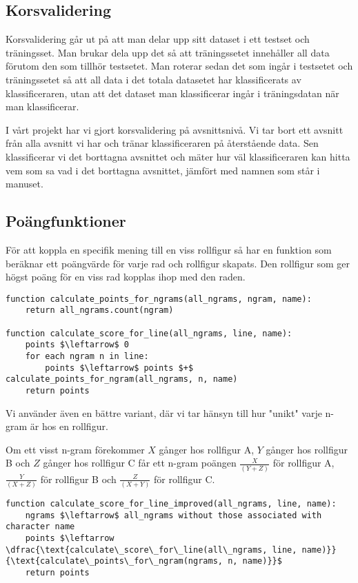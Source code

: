 \documentclass[a5paper]{article}
\begin{document}
\subsection{Korsvalidering}
Korsvalidering går ut på att man delar upp sitt dataset i ett testset och
träningsset. Man brukar dela upp det så att träningssetet innehåller all data
förutom den som tillhör testsetet. Man roterar sedan det som ingår i testsetet
och träningssetet så att all data i det totala datasetet har klassificerats av
klassificeraren, utan att det dataset man klassificerar ingår i träningsdatan
när man klassificerar.

I vårt projekt har vi gjort korsvalidering på avsnittsnivå. Vi tar bort ett
avsnitt från alla avsnitt vi har och tränar klassificeraren på återstående data.
Sen klassificerar vi det borttagna avsnittet och mäter hur väl klassificeraren
kan hitta vem som sa vad i det borttagna avsnittet, jämfört med namnen som står
i manuset.

\subsection{Poängfunktioner}
För att koppla en specifik mening till en viss rollfigur så har en funktion som
beräknar ett poängvärde för varje rad och rollfigur skapats. Den rollfigur som ger
högst poäng för en viss rad kopplas ihop med den raden.

\begin{lstlisting}[mathescape, columns=fullflexible, basicstyle=\fontfamily{lmvtt}\selectfont]
function calculate_points_for_ngrams(all_ngrams, ngram, name):
    return all_ngrams.count(ngram)

function calculate_score_for_line(all_ngrams, line, name):
    points $\leftarrow$ 0
    for each ngram n in line:
        points $\leftarrow$ points $+$ calculate_points_for_ngram(all_ngrams, n, name)
    return points
\end{lstlisting}

Vi använder även en bättre variant, där vi tar hänsyn till hur "unikt" varje
n-gram är hos en rollfigur.

Om ett visst n-gram förekommer $X$ gånger hos rollfigur A, $Y$ gånger hos rollfigur B
och $Z$ gånger hos rollfigur C får ett n-gram poängen $\frac{X}{(Y+Z)}$ för rollfigur A,
$\frac{Y}{(X+Z)}$ för rollfigur B och $\frac{Z}{(X+Y)}$ för rollfigur C.

\begin{lstlisting}[mathescape, columns=fullflexible, basicstyle=\fontfamily{lmvtt}\selectfont]
function calculate_score_for_line_improved(all_ngrams, line, name):
    ngrams $\leftarrow$ all_ngrams without those associated with character name 
    points $\leftarrow  \dfrac{\text{calculate\_score\_for\_line(all\_ngrams, line, name)}}{\text{calculate\_points\_for\_ngram(ngrams, n, name)}}$
    return points
\end{lstlisting}
\end{document}
